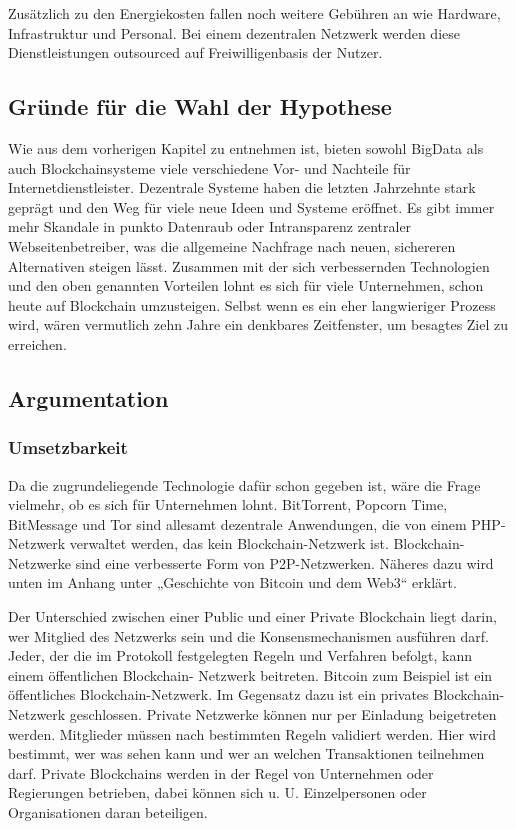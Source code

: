 Zusätzlich zu den Energiekosten fallen noch weitere Gebühren an wie Hardware, Infrastruktur und Personal.
Bei einem dezentralen Netzwerk werden diese Dienstleistungen outsourced auf Freiwilligenbasis der Nutzer.

\subsection{Gründe für die Wahl der Hypothese}
Wie aus dem vorherigen Kapitel zu entnehmen ist, bieten sowohl BigData als auch Blockchainsysteme viele verschiedene Vor- und Nachteile für Internetdienstleister. 
Dezentrale Systeme haben die letzten Jahrzehnte stark geprägt und den Weg für viele neue Ideen und Systeme eröffnet.
Es gibt immer mehr Skandale in punkto Datenraub oder Intransparenz zentraler Webseitenbetreiber, was die allgemeine Nachfrage nach neuen, sichereren Alternativen steigen lässt. 
Zusammen mit der sich verbessernden Technologien und den oben genannten Vorteilen lohnt es sich für viele Unternehmen, schon heute auf Blockchain umzusteigen.
Selbst wenn es ein eher langwieriger Prozess wird, wären vermutlich zehn Jahre ein denkbares Zeitfenster, um besagtes Ziel zu erreichen.



\subsection{Argumentation}


\subsubsection{Umsetzbarkeit}
Da die zugrundeliegende Technologie dafür schon gegeben ist, wäre die Frage vielmehr, ob es sich für Unternehmen lohnt.
BitTorrent, Popcorn Time, BitMessage und Tor sind allesamt dezentrale Anwendungen, die von einem PHP-Netzwerk verwaltet werden, das kein Blockchain-Netzwerk ist. 
Blockchain- Netzwerke sind eine verbesserte Form von P2P-Netzwerken. Näheres dazu wird unten im Anhang unter „Geschichte von Bitcoin und dem Web3“ erklärt.

Der Unterschied zwischen einer Public und einer Private Blockchain liegt darin, wer Mitglied des Netzwerks sein und die Konsensmechanismen ausführen darf. 
Jeder, der die im Protokoll festgelegten Regeln und Verfahren befolgt, kann einem öffentlichen Blockchain- Netzwerk  beitreten.  
Bitcoin  zum  Beispiel  ist  ein öffentliches Blockchain-Netzwerk.
Im Gegensatz dazu ist ein privates Blockchain-Netzwerk geschlossen. 
Private Netzwerke können nur per Einladung beigetreten werden. 
Mitglieder müssen nach bestimmten Regeln validiert werden. Hier wird bestimmt, wer was sehen kann und wer an welchen Transaktionen teilnehmen darf. 
Private Blockchains werden in der Regel von Unternehmen oder Regierungen betrieben, dabei können sich u. U. Einzelpersonen oder Organisationen daran beteiligen.

